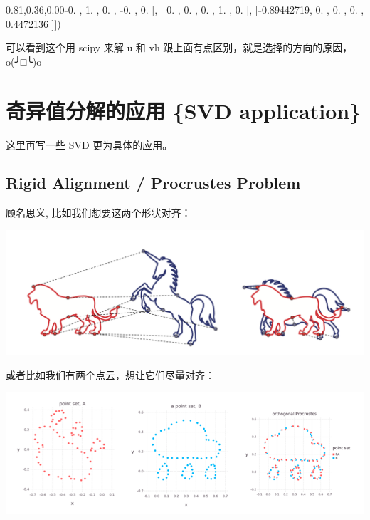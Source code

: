 \documentclass[
]{book}
\newenvironment{Shaded}{\begin{snugshade}}{\end{snugshade}}
\newcommand{\FloatTok}[1]{\textcolor[rgb]{0.00,0.00,0.81}{#1}}
\newcommand{\NormalTok}[1]{#1}
\newcommand{\OperatorTok}[1]{\textcolor[rgb]{0.81,0.36,0.00}{\textbf{#1}}}
\begin{document}
\begin{Shaded}
\begin{Highlighting}[]
\NormalTok{       [}\OperatorTok{{-}}\FloatTok{0.}\NormalTok{        ,  }\FloatTok{1.}\NormalTok{        ,  }\FloatTok{0.}\NormalTok{        , }\OperatorTok{{-}}\FloatTok{0.}\NormalTok{        ,  }\FloatTok{0.}\NormalTok{        ],}
\NormalTok{       [ }\FloatTok{0.}\NormalTok{        ,  }\FloatTok{0.}\NormalTok{        ,  }\FloatTok{0.}\NormalTok{        ,  }\FloatTok{1.}\NormalTok{        ,  }\FloatTok{0.}\NormalTok{        ],}
\NormalTok{       [}\OperatorTok{{-}}\FloatTok{0.89442719}\NormalTok{,  }\FloatTok{0.}\NormalTok{        ,  }\FloatTok{0.}\NormalTok{        ,  }\FloatTok{0.}\NormalTok{        ,  }\FloatTok{0.4472136}\NormalTok{ ]])}
\end{Highlighting}
\end{Shaded}

可以看到这个用 scipy 来解 u 和 vh 跟上面有点区别，就是选择的方向的原因，o(╯□╰)o

\hypertarget{ux5947ux5f02ux503cux5206ux89e3ux7684ux5e94ux7528-svd-application}{%
\chapter{奇异值分解的应用 \{SVD application\}}\label{ux5947ux5f02ux503cux5206ux89e3ux7684ux5e94ux7528-svd-application}}

这里再写一些 SVD 更为具体的应用。

\hypertarget{rigid-alignment-procrustes-problem}{%
\section{Rigid Alignment / Procrustes Problem}\label{rigid-alignment-procrustes-problem}}

顾名思义, 比如我们想要这两个形状对齐：

\includegraphics{images/rigid_alignment_01.png}

或者比如我们有两个点云，想让它们尽量对齐：

\includegraphics{images/rigid_alignment_02.png}
\end{document}
